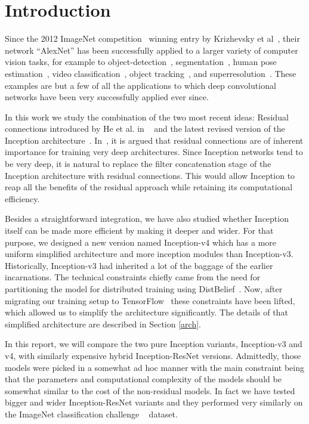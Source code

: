 \section{Introduction}

Since the 2012 ImageNet competition~\cite{russakovsky2014imagenet}
winning entry by Krizhevsky et al~\cite{krizhevsky2012imagenet},
their network ``AlexNet'' has been successfully applied to a larger variety of
computer vision tasks, for example to object-detection~\cite{girshick2014rcnn},
segmentation~\cite{long2015fully}, human pose estimation~\cite{toshev2014deeppose},
video classification~\cite{karpathy2014large}, object
tracking~\cite{wang2013learning}, and superresolution~\cite{dong2014learning}.
These examples are but a few of all the applications to which deep
convolutional networks have been very successfully applied ever since.

In this work we study the combination of the two most recent ideas:
Residual connections introduced by He et al. in ~\cite{he2015deep} and the latest
revised version of the Inception architecture~\cite{szegedy2015rethinking}.
In~\cite{he2015deep}, it is argued that residual connections are of inherent
importance for training very deep architectures. Since Inception networks
tend to be very deep, it is natural to replace the
filter concatenation stage of the Inception architecture with residual connections. This
would allow Inception to reap all the benefits of the residual approach
while retaining its computational efficiency.

Besides a straightforward integration, we have also studied whether
Inception itself can be made more efficient by making it deeper and wider.
For that purpose, we designed a new version named Inception-v4
which has a more uniform simplified architecture and more inception modules
than Inception-v3. Historically, Inception-v3 had inherited a lot of the
baggage of the earlier incarnations. The technical constraints chiefly came from
the need for partitioning the model for distributed training using
DistBelief~\cite{dean2012large}.
Now, after migrating our training setup to TensorFlow~\cite{tensorflow2015-whitepaper}
these constraints have been lifted, which allowed us to simplify the architecture
significantly. The details of that simplified architecture are described in Section \ref{arch}.

In this report, we will compare the two pure Inception variants,
Inception-v3 and v4, with similarly expensive hybrid Inception-ResNet
versions. Admittedly, those models were picked in a somewhat ad hoc manner
with the main constraint being that the parameters and computational
complexity of the models should be somewhat similar to the cost
of the non-residual models. In fact we have tested bigger and wider
Inception-ResNet variants and they performed very similarly on the
ImageNet classification challenge ~\cite{russakovsky2014imagenet}
dataset.

